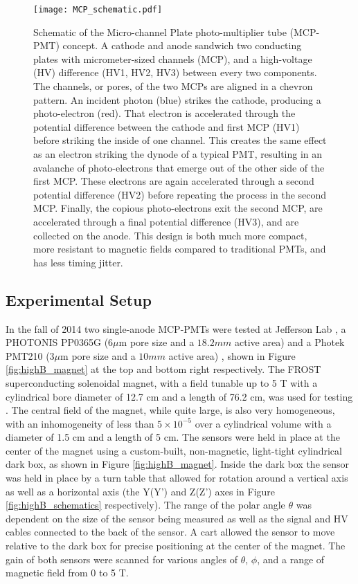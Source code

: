 \begin{figure}[!htb]
	\centering
	\texttt{[image: MCP\_schematic.pdf]}
	\caption{Schematic of the Micro-channel Plate photo-multiplier tube (MCP-PMT) concept. A cathode and anode sandwich two conducting plates with micrometer-sized channels (MCP), and a high-voltage (HV) difference (HV1, HV2, HV3) between every two components. The channels, or pores, of the two MCPs are aligned in a chevron pattern. An incident photon (blue) strikes the cathode, producing a photo-electron (red). That electron is accelerated through the potential difference between the cathode and first MCP (HV1) before striking the inside of one channel. This creates the same effect as an electron striking the dynode of a typical PMT, resulting in an avalanche of photo-electrons that emerge out of the other side of the first MCP. These electrons are again accelerated through a second potential difference (HV2) before repeating the process in the second MCP. Finally, the copious photo-electrons exit the second MCP, are accelerated through a final potential difference (HV3), and are collected on the anode. This design is both much more compact, more resistant to magnetic fields compared to traditional PMTs, and has less timing jitter. }
	\label{fig:MCP_schematic}
\end{figure}

\subsection{Experimental Setup}
In the fall of 2014 two single-anode MCP-PMTs were tested at Jefferson Lab \cite{HighB_DIRC2015}, a PHOTONIS PP0365G ($6 \mu\text{m}$ pore size and a $18.2 \unit{mm}$ active area) \cite{PHOTONIS} and a Photek PMT210 ($3 \mu\text{m}$ pore size and a $10 \unit{mm}$ active area)  \cite{Photek}, shown in Figure \ref{fig:highB_magnet} at the top and bottom right respectively. The FROST  superconducting solenoidal magnet, with a field tunable up to 5 T with a cylindrical bore diameter of 12.7 cm and a length of 76.2 cm, was used for testing \cite{JLab_FrozenTarget}. The central field of the magnet, while quite large, is also very homogeneous, with an inhomogeneity of less than $5\times10^{-5}$ over a cylindrical volume with a diameter of 1.5 cm and a length of 5 cm. The sensors were held in place at the center of the magnet using a custom-built, non-magnetic, light-tight cylindrical dark box, as shown in Figure \ref{fig:highB_magnet}. Inside the dark box the sensor was held in place by a turn table that allowed for rotation around a vertical axis as well as a horizontal axis (the Y(Y') and Z(Z') axes in Figure \ref{fig:highB_schematics} respectively). The range of the polar angle $\theta$ was dependent on the size of the sensor being measured as well as the signal and HV cables connected to the back of the sensor. A cart allowed the sensor to move relative to the dark box for precise positioning at the center of the magnet. The gain of both sensors were scanned for various angles of $\theta$, $\phi$, and a range of magnetic field from 0 to 5 T.

